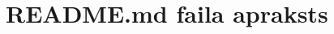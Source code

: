 \hypertarget{_r_e_a_d_m_e_8md}{}\section{R\+E\+A\+D\+M\+E.\+md faila apraksts}
\label{_r_e_a_d_m_e_8md}
